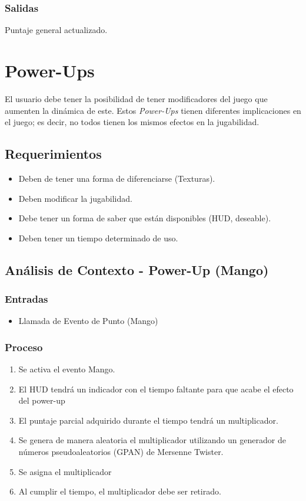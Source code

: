 \documentclass[letterpaper]{scrreprt}
\begin{document}
\subsubsection{Salidas}
Puntaje general actualizado.


\section{Power-Ups}
El usuario debe tener la posibilidad de tener modificadores del juego que aumenten la dinámica de este. Estos \emph{Power-Ups} tienen diferentes implicaciones en el juego; es decir, no todos tienen los mismos efectos en la jugabilidad.
\subsection{Requerimientos}
\begin{itemize}
	\item Deben de tener una forma de diferenciarse (Texturas).
	\item Deben modificar la jugabilidad.
	\item Debe tener un forma de saber que están disponibles (HUD, deseable).
	\item Deben tener un tiempo determinado de uso.
\end{itemize}

\subsection{Análisis de Contexto - Power-Up (Mango)}
\subsubsection{Entradas}
\begin{itemize}
	\item Llamada de Evento de Punto (Mango)
\end{itemize}
\subsubsection{Proceso}
\begin{enumerate}
	\item Se activa el evento Mango.
	\item El HUD tendrá un indicador con el tiempo faltante para que acabe el efecto del power-up
	\item El puntaje parcial adquirido durante el tiempo tendrá un multiplicador.
	\item Se genera de manera aleatoria el multiplicador utilizando un generador de números pseudoaleatorios (GPAN) de Mersenne Twister.
	\item Se asigna el multiplicador
	\item Al cumplir el tiempo, el multiplicador debe ser retirado.
\end{enumerate}
\end{document}
